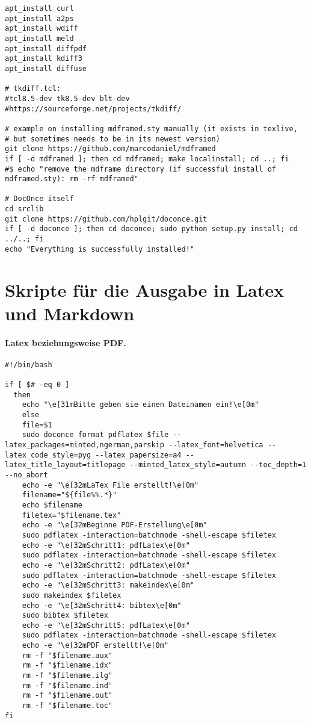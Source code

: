 \documentclass[%
oneside,                 %
final,                   %
chapterprefix=true,      %
open=right,              %
10pt]{book}
\begin{document}
\begin{verbatim}
apt_install curl
apt_install a2ps
apt_install wdiff
apt_install meld
apt_install diffpdf
apt_install kdiff3
apt_install diffuse

# tkdiff.tcl:
#tcl8.5-dev tk8.5-dev blt-dev
#https://sourceforge.net/projects/tkdiff/

# example on installing mdframed.sty manually (it exists in texlive,
# but sometimes needs to be in its newest version)
git clone https://github.com/marcodaniel/mdframed
if [ -d mdframed ]; then cd mdframed; make localinstall; cd ..; fi
#$ echo "remove the mdframe directory (if successful install of mdframed.sty): rm -rf mdframed"

# DocOnce itself
cd srclib
git clone https://github.com/hplgit/doconce.git
if [ -d doconce ]; then cd doconce; sudo python setup.py install; cd ../..; fi
echo "Everything is successfully installed!"
\end{verbatim}
\section{Skripte für die Ausgabe in Latex und Markdown}
\paragraph{Latex beziehungsweise PDF.}

\begin{verbatim}
#!/bin/bash

if [ $# -eq 0 ]
  then
    echo "\e[31mBitte geben sie einen Dateinamen ein!\e[0m"
    else
    file=$1
    sudo doconce format pdflatex $file --latex_packages=minted,ngerman,parskip --latex_font=helvetica --latex_code_style=pyg --latex_papersize=a4 --latex_title_layout=titlepage --minted_latex_style=autumn --toc_depth=1 --no_abort
    echo -e "\e[32mLaTex File erstellt!\e[0m"
    filename="${file%%.*}"
    echo $filename
    filetex="$filename.tex"
    echo -e "\e[32mBeginne PDF-Erstellung\e[0m"
    sudo pdflatex -interaction=batchmode -shell-escape $filetex
    echo -e "\e[32mSchritt1: pdfLatex\e[0m"
    sudo pdflatex -interaction=batchmode -shell-escape $filetex
    echo -e "\e[32mSchritt2: pdfLatex\e[0m"
    sudo pdflatex -interaction=batchmode -shell-escape $filetex
    echo -e "\e[32mSchritt3: makeindex\e[0m"
    sudo makeindex $filetex
    echo -e "\e[32mSchritt4: bibtex\e[0m"
    sudo bibtex $filetex
    echo -e "\e[32mSchritt5: pdfLatex\e[0m"
    sudo pdflatex -interaction=batchmode -shell-escape $filetex
    echo -e "\e[32mPDF erstellt!\e[0m"
    rm -f "$filename.aux"
    rm -f "$filename.idx"
    rm -f "$filename.ilg"
    rm -f "$filename.ind"
    rm -f "$filename.out"
    rm -f "$filename.toc"
fi
\end{verbatim}
\end{document}
